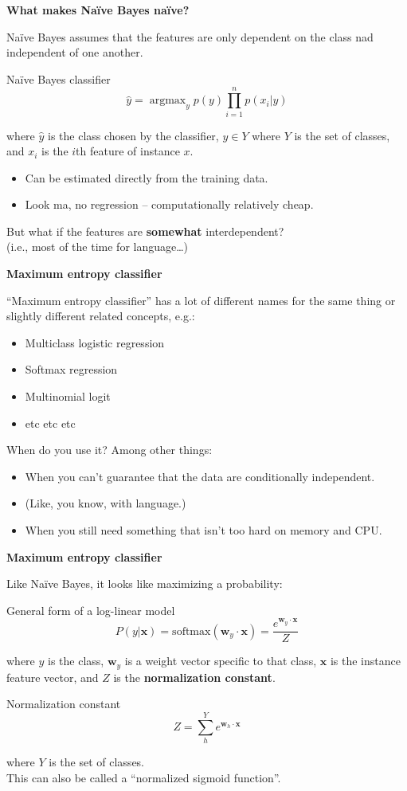 \documentclass{beamer}
\newcommand{\pagestepalt}[2]{
  \begin{frame}[t]
    \begin{minipage}[t][0.26\textheight][t]{\textwidth}
      \begin{center}
        \huge
        \textbf{#1}
      \end{center}
    \end{minipage}
    
    \begin{minipage}[t][0.7\textheight][c]{\textwidth}
      #2
    \end{minipage}
  \end{frame}
}
\DeclareMathOperator*{\argmax}{argmax}
\begin{document}
\pagestepalt{What makes Na\"{i}ve Bayes na\"{i}ve?}{
  \pause
  Na\"{i}ve Bayes assumes that the features are only dependent on the class
  nad independent of one another.\pause
  \begin{block}{Na\"{i}ve Bayes classifier}
      \[\hat{y} = \argmax_y p(y) \prod^n_{i=1} p(x_i | y)\]
  \end{block}
  where $\hat{y}$ is the class chosen by the classifier, $y \in Y$
  where $Y$ is the set of classes, and $x_i$ is the $i$th feature of
  instance $x$.\pause
  \begin{itemize}
  \item Can be estimated directly from the training data. \pause
  \item Look ma, no regression -- computationally relatively cheap. \pause
  \end{itemize}
  But what if the features are \textbf{somewhat} interdependent?\\
  (i.e., most of the time for language\ldots)
}

\pagestepalt{Maximum entropy classifier}{
  ``Maximum entropy classifier'' has a lot of different names for the same
  thing or slightly different related concepts, e.g.:
  \begin{itemize}
  \item Multiclass logistic regression
  \item Softmax regression
  \item Multinomial logit
  \item etc etc etc
  \end{itemize}\pause
  When do you use it? Among other things:\pause
  \begin{itemize}
  \item When you can't guarantee that the data are conditionally independent.\pause
  \item (Like, you know, with language.)\pause
  \item When you still need something that isn't too hard on memory and CPU.
  \end{itemize}
}

\pagestepalt{Maximum entropy classifier}{
  \vspace{-1.0cm}
  Like Na\"{i}ve Bayes, it looks like maximizing a probability:\pause
  \begin{block}{General form of a log-linear model}
      \[P(y|\mathbf{x}) = \text{softmax}(\mathbf{w}_y \cdot \mathbf{x}) = \frac{e^{\mathbf{w}_y \cdot \mathbf{x}}}{Z}\]
  \end{block}\pause
  where $y$ is the class, $\mathbf{w}_y$ is a weight vector
  \alert{specific to that class}, $\mathbf{x}$ is the instance feature
  vector, and $Z$ is the \textbf{normalization constant}.\pause
  \begin{block}{Normalization constant}
    \[Z = \sum_h^Y e^{\mathbf{w}_h \cdot \mathbf{x}}\]
  \end{block}
  where $Y$ is the set of classes.\pause\\
  This can also be called a ``normalized sigmoid function''. 
}
\end{document}

